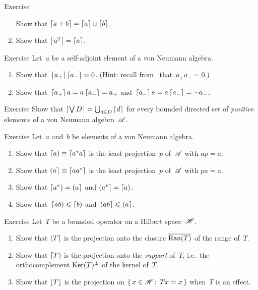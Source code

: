 \documentclass[a]{subfiles}
\begin{document}
\begin{parsec}
\begin{point}{Exercise}
\begin{enumerate}
Show that $\left\lceil a+b\right\rceil=\left\lceil a\right\rceil\cup\left\lceil b\right\rceil$.
\item
Show that $\left\lceil a^2\right\rceil=\left\lceil a\right\rceil$.
\end{enumerate}
\end{point}
\begin{point}{Exercise}%
Let~$a$ be a self-adjoint element of a von Neumann algebra.
\begin{enumerate}
\item
Show that~$\left\lceil a_+\right\rceil\left\lceil a_-\right\rceil= 0$.
(Hint: recall from~ that~$a_+a_-=0$.)
\item
	Show that~$\left\lceil a_+\right\rceil a = a\left\lceil a_+\right\rceil = a_+$
	and~$\left\lceil a_-\right\rceil a=a\left\lceil a_-\right\rceil = -a_-$.
\end{enumerate}
\end{point}
\begin{point}{Exercise}%
Show that $\left\lceil\bigvee D\right\rceil = \bigcup_{d\in D}\left\lceil d\right\rceil$
for every bounded directed set of \emph{positive}
elements of a von Neumann algebra~$\mathscr{A}$.
\end{point}
\begin{point}{Exercise}%
Let~$a$ and~$b$  be elements of a von Neumann algebra.
\begin{enumerate}
\item
Show that $\left\lceil a\right)\equiv \left\lceil a^*a\right\rceil$
is the least projection~$p$ of~$\mathscr{A}$
with $ap =a$.

\item
Show that $\left(a\right\rceil\equiv \left\lceil aa^*\right\rceil$
is the least projection~$p$ of~$\mathscr{A}$
with $pa=a$.

\item
Show that $\left\lceil a^*\right)=\left(a\right\rceil$
and $\left(a^*\right\rceil=\left\lceil a\right)$.

\item
Show that~$\left\lceil ab\right)\leqslant\left\lceil b\right)$
and~$\left(ab\right\rceil\leqslant\left(a\right\rceil$.
\end{enumerate}
\end{point}
\begin{point}{Exercise}%
Let~$T$ be a bounded operator on a Hilbert space~$\mathscr{H}$.
\begin{enumerate}
\item
Show that $\left(T\right\rceil$
is the projection onto the closure
$\overline{\operatorname{Ran}(T)}$ of the range of~$T$.
\item
Show that $\left\lceil T\right)$
is the projection onto the \emph{support}
of~$T$, i.e.~the orthocomplement
$\operatorname{Ker}(T)^\perp$ of the kernel of~$T$.
\item
Show that $\left\lfloor T\right\rfloor$ is the projection
on $\{\,x\in\mathscr{H}\colon\, Tx=x\,\}$
when~$T$ is an effect.
\end{enumerate}
\end{point}
\end{parsec}
\end{document}
